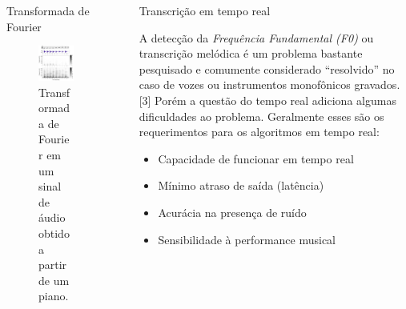 \documentclass[final,hyperref={pdfpagelabels=false}]{beamer}
\begin{document}
\begin{frame}[t]
\begin{columns}[t]
\begin{column}{.465\textwidth}
\begin{block}{Transformada de Fourier}
\begin{figure}%
\centering
\includegraphics[width=0.7\linewidth]{fourier}
\caption{Transformada de Fourier em um sinal de áudio obtido a partir de um piano.}
\end{figure}

\end{block}


\end{column} %

\begin{column}{.03\textwidth}\end{column} %

\begin{column}{.465\textwidth} %
\begin{block}{Transcrição em tempo real}

A detecção da \emph{Frequência Fundamental (F0)} ou transcrição melódica é um problema bastante pesquisado e comumente considerado ``resolvido'' no caso de vozes ou instrumentos monofônicos gravados.[3] Porém a questão do tempo real adiciona algumas dificuldades ao problema. Geralmente esses são os requerimentos para os algoritmos em tempo real:

\begin{changemargin}{2cm}{2cm}
\begin{itemize}
\item Capacidade de funcionar em tempo real
\item Mínimo atraso de saída (latência)
\item Acurácia na presença de ruído
\item Sensibilidade à performance musical
\end{itemize}
\end{changemargin}


\end{block}
\end{column}
\end{columns}
\end{frame}
\end{document}
